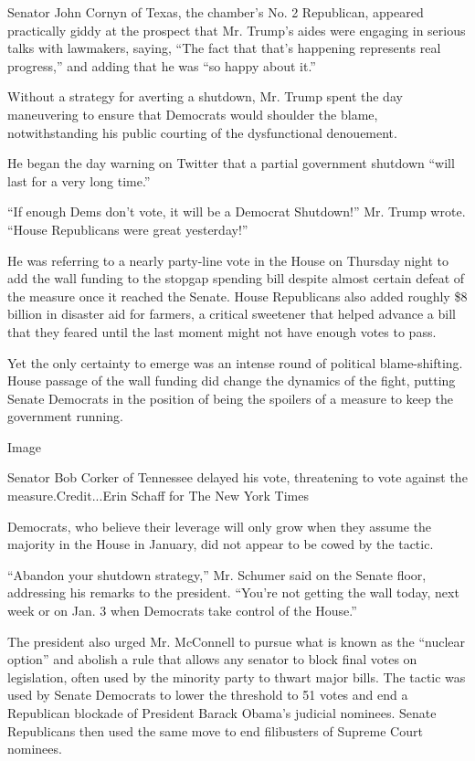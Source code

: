Senator John Cornyn of Texas, the chamber's No. 2 Republican, appeared
practically giddy at the prospect that Mr. Trump's aides were engaging
in serious talks with lawmakers, saying, ``The fact that that's
happening represents real progress,'' and adding that he was ``so happy
about it.''

Without a strategy for averting a shutdown, Mr. Trump spent the day
maneuvering to ensure that Democrats would shoulder the blame,
notwithstanding his public courting of the dysfunctional denouement.

He began the day warning on Twitter that a partial government shutdown
``will last for a very long time.''

``If enough Dems don't vote, it will be a Democrat Shutdown!'' Mr. Trump
wrote. ``House Republicans were great yesterday!''

He was referring to a nearly party-line vote in the House on Thursday
night to add the wall funding to the stopgap spending bill despite
almost certain defeat of the measure once it reached the Senate. House
Republicans also added roughly \$8 billion in disaster aid for farmers,
a critical sweetener that helped advance a bill that they feared until
the last moment might not have enough votes to pass.

Yet the only certainty to emerge was an intense round of political
blame-shifting. House passage of the wall funding did change the
dynamics of the fight, putting Senate Democrats in the position of being
the spoilers of a measure to keep the government running.

Image

Senator Bob Corker of Tennessee delayed his vote, threatening to vote
against the measure.Credit...Erin Schaff for The New York Times

Democrats, who believe their leverage will only grow when they assume
the majority in the House in January, did not appear to be cowed by the
tactic.

``Abandon your shutdown strategy,'' Mr. Schumer said on the Senate
floor, addressing his remarks to the president. ``You're not getting the
wall today, next week or on Jan. 3 when Democrats take control of the
House.''

The president also urged Mr. McConnell to pursue what is known as the
``nuclear option'' and abolish a rule that allows any senator to block
final votes on legislation, often used by the minority party to thwart
major bills. The tactic was used by Senate Democrats to lower the
threshold to 51 votes and end a Republican blockade of President Barack
Obama's judicial nominees. Senate Republicans then used the same move to
end filibusters of Supreme Court nominees.

